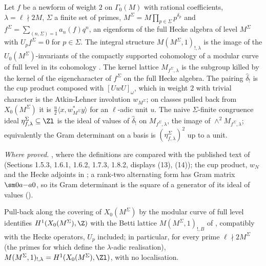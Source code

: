 \begin{sloppypar}
\begin{definition}\label{def:paper:dfg-objects}
Let $f$ be a newform of weight $2$ on $\Gamma_0(M)$ with rational coefficients, $\lambda=\ell\nmid2M$, $\Sigma$ a finite set of primes, $M^\Sigma=M\prod_{p\in\Sigma}p^{\delta_p}$ and
$f^\Sigma=\sum_{(n,\Sigma)=1}a_n(f)q^n$, an eigenform of the full Hecke algebra of level $M^\Sigma$ with $U_pf^\Sigma=0$ for $p\in\Sigma$. The integral structure $M(M^\Sigma,1)_{!,\lambda}$ is the image of
the $U_0(M^\Sigma)$-invariants of the compactly supported cohomology of a modular curve of full level in its cohomology \cite[Sections 1.2, 1.4]{DFG04}. The kernel lattice
$M_{f^\Sigma,\lambda}$ is the subgroup killed by the kernel of the eigencharacter of $f^\Sigma$ on the full Hecke algebra. The pairing $\hat\delta_!$ is the cup product composed with
$[UwU]_\omega$, which in weight $2$ with trivial character is the Atkin-Lehner involution $w_{M^\Sigma}$; on classes pulled back from $X_0(M^\Sigma)$ it is $\frac u2\langle x,w^*_{M^\Sigma}y\rangle$ for an $\ell$-adic unit $u$.
The naive $\Sigma$-finite congruence ideal $\eta^\Sigma_{f,\lambda}\subseteq\Zl$ is the ideal of values of $\hat\delta_!$ on $M_{f^\Sigma,\lambda}$, the image of $\wedge^2M_{f^\Sigma,\lambda}$; equivalently the Gram
determinant on a basis is $(\eta^\Sigma_{f,\lambda})^2$ up to a unit.
\end{definition}

\noindent\emph{Where proved.} , where the definitions are compared with the published text of \cite{DFG04} (Sections 1.5.3, 1.6.1, 1.6.2, 1.7.3, 1.8.2,
displays (13), (14)); the cup product, $w_N$ and the Hecke adjoints in ; a rank-two alternating form has Gram matrix $\sm0a{-a}0$, so its Gram
determinant is the square of a generator of its ideal of values ().

\begin{proposition}\label{prop:paper:integral}
Pull-back along the covering of $X_0(M^\Sigma)$ by the modular curve of full level identifies $H^1(X_0(M^\Sigma),\Z)$ with the Betti lattice
$M(M^\Sigma,1)_{!,B}$ of \cite[Section 1.4.2]{DFG04}, compatibly with the Hecke operators, $U_p$ included; in particular, for every prime $\ell\nmid2M^\Sigma$ (the primes for which \cite{DFG04} define the $\lambda$-adic realisation),
$M(M^\Sigma,1)_{!,\lambda}=H^1(X_0(M^\Sigma),\Zl)$, with no localisation.
\end{proposition}


\end{sloppypar}

